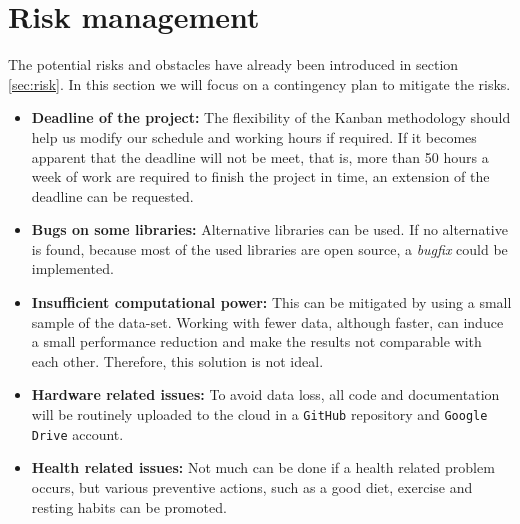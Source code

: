 \section{Risk management}
\label{sec:risk_management}
The potential risks and obstacles have already been introduced in section \ref{sec:risk}. In this section we will focus on a contingency plan to mitigate the risks.

\begin{itemize}
    \item \textbf{Deadline of the project:} The flexibility of the Kanban methodology should help us modify our schedule and working hours if required. If it becomes apparent that the deadline will not be meet, that is, more than 50 hours a week of work are required to finish the project in time, an extension of the deadline can be requested.
    \item \textbf{Bugs on some libraries:} Alternative libraries can be used. If no alternative is found, because most of the used libraries are open source, a \emph{bugfix} could be implemented. 
    \item \textbf{Insufficient computational power:} This can be mitigated by using a small sample of the data-set. Working with fewer data, although faster, can induce a small performance reduction and make the results not comparable with each other. Therefore, this solution is not ideal. 
    \item \textbf{Hardware related issues:} To avoid data loss, all code and documentation will be routinely uploaded to the cloud in a \texttt{GitHub} repository and \texttt{Google Drive} account.
    \item \textbf{Health related issues:} Not much can be done if a health related problem occurs, but various preventive actions, such as a good diet, exercise and resting habits can be promoted.
\end{itemize}




